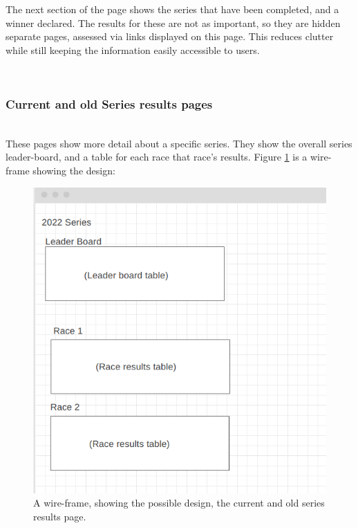 \documentclass{l4proj}
\begin{document}
The next section of the page shows the series that have been completed, and a winner declared. The results for these are not as important, so they are hidden separate pages, assessed via links displayed on this page. This reduces clutter while still keeping the information easily accessible to users.

\hfill\\
\subsubsection{Current and old Series results pages}
\hfill\\
These pages show more detail about a specific series. They show the overall series leader-board, and a table for each race that race’s results. Figure \ref{fig:detailsWF} is a wire-frame showing the design:

\begin{figure}[h!]
    \centering
    \includegraphics[width=1\linewidth]{images/moreDetailWireframe.png} 

    \caption{A wire-frame, showing the possible design, the current and old series results page.
    }

    \label{fig:detailsWF}
\end{figure}
\end{document}

